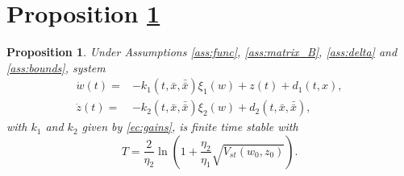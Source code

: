 \documentclass[onecolumn]{IEEEtran}
\newtheorem{propo}{Proposition}
\begin{document}
\appendix



\section{Proposition \ref{prop:STA}}
\label{app:STA}
\begin{propo}
	\label{prop:STA}
	Under Assumptions \ref{ass:func}, \ref{ass:matrix_B}, \ref{ass:delta} and \ref{ass:bounds}, system 
	\begin{equation*}
	\begin{split}
	\dot w(t)=&-k_1(t,\bar x,\bar {\bar x})\xi_1(w)+z(t)+d_1(t,x),\\
	\dot z(t)=&-k_2(t,\bar x,\bar {\bar x})\xi_2(w)+d_2(t,\bar x,\bar {\bar{x}}),
	\end{split}
	\end{equation*}
	 with $k_1$ and $k_2$ given by \eqref{ec:gains},  is finite time stable  with 
	\begin{equation*}
	T=\dfrac{2}{\eta_2}\ln \left(1+\dfrac{\eta_2}{\eta_1}\sqrt{V_{st}(w_0,z_0)}\right). 
	\end{equation*}
\end{propo} 
\end{document}
